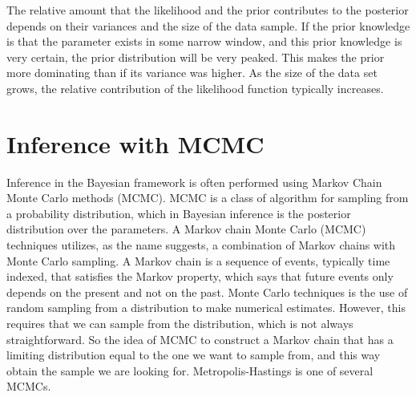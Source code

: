 The relative amount that the likelihood and the prior contributes to the posterior depends on their variances and the size of the data sample. If the prior knowledge is that the parameter exists in some narrow window, and this prior knowledge is very certain, the prior distribution will be very peaked. This makes the prior more dominating than if its variance was higher. As the size of the data set grows, the relative contribution of the likelihood function typically  increases. 










\section{Inference with MCMC}
\label{Metropolis}

Inference in the Bayesian framework is often performed using Markov Chain Monte Carlo methods (MCMC). MCMC is a class of algorithm for sampling from a probability distribution, which in Bayesian inference is the posterior distribution over the parameters. A Markov chain Monte Carlo (MCMC) techniques utilizes, as the name suggests, a combination of Markov chains with Monte Carlo sampling. A Markov chain is a sequence of events, typically time indexed, that satisfies the Markov property, which says that future events only depends on the present and not on the past. Monte Carlo techniques is the use of random sampling from a distribution to make numerical estimates. However, this requires that we can sample from the distribution, which is not always straightforward. So the idea of MCMC to construct a Markov chain that has a limiting distribution equal to the one we want to sample from, and this way obtain the sample we are looking for. Metropolis-Hastings is one of several MCMCs.

